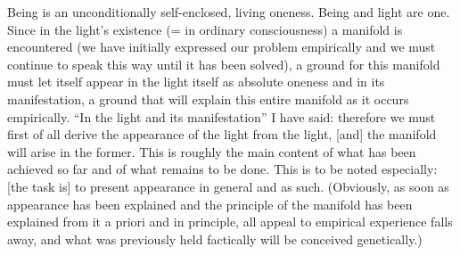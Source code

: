 Being is an unconditionally
self-enclosed, living oneness.
Being and light are one.
Since in the light's existence
(= in ordinary consciousness)
a manifold is encountered
(we have initially expressed our problem empirically
and we must continue to speak this way until it has been solved),
a ground for this manifold must let itself
appear in the light itself as absolute oneness and
in its manifestation,
a ground that will explain this entire manifold
as it occurs empirically.
“In the light and its manifestation”
I have said:
therefore we must first of all derive
the appearance of the light from the light,
[and] the manifold will arise in the former.
This is roughly the main content of
what has been achieved so far and of
what remains to be done.
This is to be noted especially:
[the task is] to present appearance in general and as such.
(Obviously, as soon as appearance has been explained
and the principle of the manifold has been explained
from it a priori and in principle,
all appeal to empirical experience falls away,
and what was previously held factically
will be conceived genetically.)

